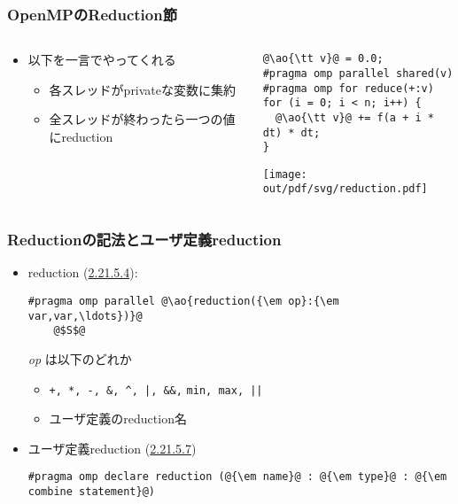 \documentclass[10pt,dvipdfmx]{beamer}
\newcommand{\sectionreductionclause}{\href{https://www.openmp.org/spec-html/5.1/openmpsu117.html\#x152-1760002.21.5.4}{2.21.5.4}}
\newcommand{\sectiondeclarereductionclause}{\href{https://www.openmp.org/spec-html/5.1/openmpsu117.html\#x152-1790002.21.5.7}{2.21.5.7}}
\newcommand{\ao}[1]{{\color{blue}#1}}
\begin{document}
\begin{frame}[fragile]
\frametitle{OpenMPのReduction節}
\begin{columns}
  \begin{column}{0.6\textwidth}
\begin{itemize}
\item 以下を一言でやってくれる
  \begin{itemize}
  \item 各スレッドがprivateな変数に集約
  \item 全スレッドが終わったら一つの値にreduction
  \end{itemize}
\end{itemize}
\end{column}

\begin{column}{0.4\textwidth}
\begin{lstlisting}
@\ao{\tt v}@ = 0.0;
#pragma omp parallel shared(v)
#pragma omp for reduce(+:v)
for (i = 0; i < n; i++) {
  @\ao{\tt v}@ += f(a + i * dt) * dt;
}    
\end{lstlisting}

\texttt{[image: out/pdf/svg/reduction.pdf]}
\end{column}  

\end{columns}
\end{frame}


\begin{frame}[fragile]
\frametitle{Reductionの記法とユーザ定義reduction}
\begin{itemize}
\item reduction (\sectionreductionclause):
\begin{lstlisting}
#pragma omp parallel @\ao{reduction({\em op}:{\em var,var,\ldots})}@
    @$S$@
\end{lstlisting}
{\em op} は以下のどれか
\begin{itemize}
\item \verb!+, *, -, &, ^, |, &&,! {\tt min, max, ||}
\item ユーザ定義のreduction名
\end{itemize}

\item ユーザ定義reduction (\sectiondeclarereductionclause)
\begin{lstlisting}
#pragma omp declare reduction (@{\em name}@ : @{\em type}@ : @{\em combine statement}@)
\end{lstlisting}
\end{itemize}
\end{frame}
\end{document}
